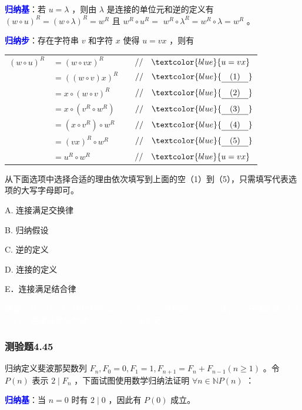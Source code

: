 \documentclass[UTF8, heading=true]{ctexart}
\begin{document}
\textcolor{blue}{\textbf{归纳基}}：若 $u=\lambda$ ，则由 $\lambda$ 是连接的单位元和逆的定义有 $(w \circ u)^R=(w \circ \lambda)^R=w^R$ 且 $w^R \circ u^R=$ $w^R \circ \lambda^R=w^R \circ \lambda=w^R$ 。

\textcolor{blue}{\textbf{归纳步}}：存在字符串 $v$ 和字符 $x$ 使得 $u=v x$ ，则有


\begin{table}[H]
  \renewcommand{\arraystretch}{1.5}
  \centering
\begin{tabular}{rlrl}
  $(w \circ u)^R$ & $=(w \circ v x)^R$ & & $/ / \quad \textcolor{blue}{u = v x}$ \\
  & $=((w \circ v) x)^R$ & & $/ / \quad \textcolor{blue}{\underline{\quad (1) \quad}}$ \\
  & $=x \circ(w \circ v)^R$ & & $/ / \quad \textcolor{blue}{\underline{\quad (2) \quad}}$ \\
  & $=x \circ\left(v^R \circ w^R\right)$ & & $/ / \quad \textcolor{blue}{\underline{\quad (3) \quad}}$ \\
  & $=\left(x \circ v^R\right) \circ w^R$ & & $/ / \quad \textcolor{blue}{\underline{\quad (4) \quad}}$ \\
  & $=(v x)^R \circ w^R$ & & $/ / \quad \textcolor{blue}{\underline{\quad (5) \quad}}$ \\
  & $=u^R \circ w^R$ & & $/ / \quad \textcolor{blue}{u = v x}$
\end{tabular}
\end{table}


从下面选项中选择合适的理由依次填写到上面的空（1）到（5），只需填写代表选项的大写字母即可。

A. 连接满足交换律

B. 归纳假设

C. 逆的定义

D.  连接的定义

E．连接满足结合律

\textcolor{white}{答案：（1）D；d；连接的定义
（2）C；c；逆的定义
（3）B；b；归纳假设
（4）E；e；连接满足结合律
（5）C；c；逆的定义}


\subsubsection{测验题4.45}

归纳定义斐波那契数列 $F_n, F_0=0, F_1=1, F_{n+1}=F_n+F_{n-1}(n \geq 1)$ 。令 $P(n)$ 表示 $2 \mid F_n$ ，下面试图使用数学归纳法证明 $\forall n \in \mathbb{N} P(n)$ ：

\textcolor{blue}{\textbf{归纳基}}：当 $n=0$ 时有 $2 \mid 0$ ，因此有 $P(0)$ 成立。
\end{document}
